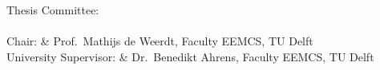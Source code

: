 Thesis Committee:\\\\
Chair: & Prof.\ Mathijs de Weerdt, Faculty EEMCS, TU Delft\\
University Supervisor: & Dr.\ Benedikt Ahrens, Faculty EEMCS, TU Delft\\
